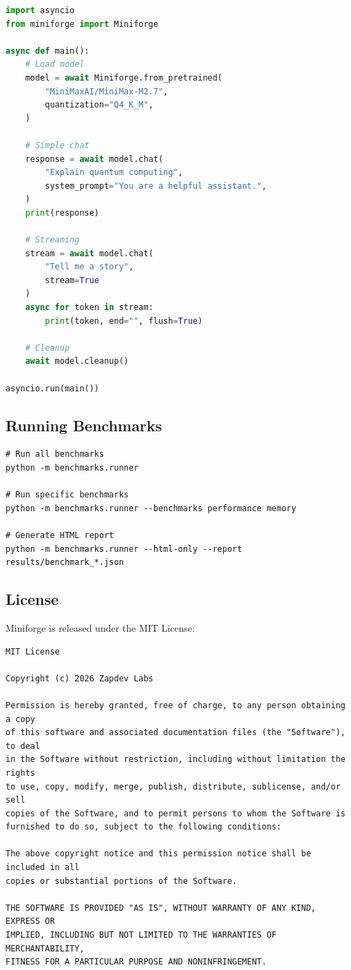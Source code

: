 \begin{lstlisting}[language=Python, caption=Basic Usage]
import asyncio
from miniforge import Miniforge

async def main():
    # Load model
    model = await Miniforge.from_pretrained(
        "MiniMaxAI/MiniMax-M2.7",
        quantization="Q4_K_M",
    )
    
    # Simple chat
    response = await model.chat(
        "Explain quantum computing",
        system_prompt="You are a helpful assistant.",
    )
    print(response)
    
    # Streaming
    stream = await model.chat(
        "Tell me a story",
        stream=True
    )
    async for token in stream:
        print(token, end="", flush=True)
    
    # Cleanup
    await model.cleanup()

asyncio.run(main())
\end{lstlisting}

\subsection{Running Benchmarks}

\begin{verbatim}
# Run all benchmarks
python -m benchmarks.runner

# Run specific benchmarks
python -m benchmarks.runner --benchmarks performance memory

# Generate HTML report
python -m benchmarks.runner --html-only --report results/benchmark_*.json
\end{verbatim}

\subsection{License}

Miniforge is released under the MIT License:

\begin{verbatim}
MIT License

Copyright (c) 2026 Zapdev Labs

Permission is hereby granted, free of charge, to any person obtaining a copy
of this software and associated documentation files (the "Software"), to deal
in the Software without restriction, including without limitation the rights
to use, copy, modify, merge, publish, distribute, sublicense, and/or sell
copies of the Software, and to permit persons to whom the Software is
furnished to do so, subject to the following conditions:

The above copyright notice and this permission notice shall be included in all
copies or substantial portions of the Software.

THE SOFTWARE IS PROVIDED "AS IS", WITHOUT WARRANTY OF ANY KIND, EXPRESS OR
IMPLIED, INCLUDING BUT NOT LIMITED TO THE WARRANTIES OF MERCHANTABILITY,
FITNESS FOR A PARTICULAR PURPOSE AND NONINFRINGEMENT.
\end{verbatim}


